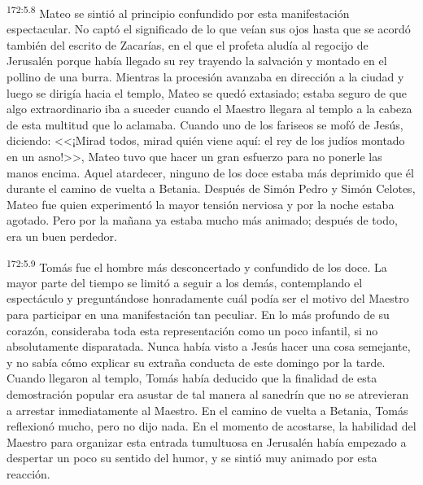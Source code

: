 \par 
\textsuperscript{172:5.8} Mateo se sintió al principio confundido por esta manifestación espectacular. No captó el significado de lo que veían sus ojos hasta que se acordó también del escrito de Zacarías, en el que el profeta aludía al regocijo de Jerusalén porque había llegado su rey trayendo la salvación y montado en el pollino de una burra. Mientras la procesión avanzaba en dirección a la ciudad y luego se dirigía hacia el templo, Mateo se quedó extasiado; estaba seguro de que algo extraordinario iba a suceder cuando el Maestro llegara al templo a la cabeza de esta multitud que lo aclamaba. Cuando uno de los fariseos se mofó de Jesús, diciendo: <<¡Mirad todos, mirad quién viene aquí: el rey de los judíos montado en un asno!>>, Mateo tuvo que hacer un gran esfuerzo para no ponerle las manos encima. Aquel atardecer, ninguno de los doce estaba más deprimido que él durante el camino de vuelta a Betania. Después de Simón Pedro y Simón Celotes, Mateo fue quien experimentó la mayor tensión nerviosa y por la noche estaba agotado. Pero por la mañana ya estaba mucho más animado; después de todo, era un buen perdedor.

\par 
\textsuperscript{172:5.9} Tomás fue el hombre más desconcertado y confundido de los doce. La mayor parte del tiempo se limitó a seguir a los demás, contemplando el espectáculo y preguntándose honradamente cuál podía ser el motivo del Maestro para participar en una manifestación tan peculiar. En lo más profundo de su corazón, consideraba toda esta representación como un poco infantil, si no absolutamente disparatada. Nunca había visto a Jesús hacer una cosa semejante, y no sabía cómo explicar su extraña conducta de este domingo por la tarde. Cuando llegaron al templo, Tomás había deducido que la finalidad de esta demostración popular era asustar de tal manera al sanedrín que no se atrevieran a arrestar inmediatamente al Maestro. En el camino de vuelta a Betania, Tomás reflexionó mucho, pero no dijo nada. En el momento de acostarse, la habilidad del Maestro para organizar esta entrada tumultuosa en Jerusalén había empezado a despertar un poco su sentido del humor, y se sintió muy animado por esta reacción.

